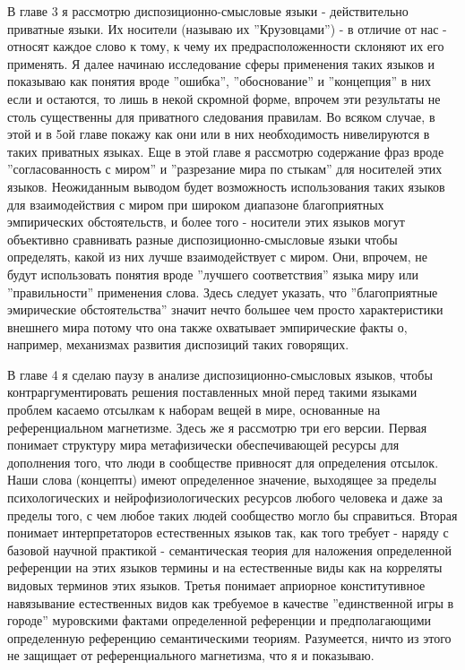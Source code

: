 \documentclass{book}
\begin{document}
В главе 3 я рассмотрю диспозиционно-смысловые языки - действительно приватные языки. Их носители (называю их ''Крузовцами'') - в отличие от нас - относят каждое слово к тому, к чему их предрасположенности склоняют их его применять. Я далее начинаю исследование сферы применения таких языков и показываю как понятия вроде ''ошибка'', ''обоснование'' и ''концепция'' в них если и остаются, то лишь в некой скромной форме, впрочем эти результаты не столь существенны для приватного следования правилам. Во всяком случае, в этой и в 5ой главе покажу как они или в них необходимость нивелируются в таких приватных языках. Еще в этой главе я рассмотрю содержание фраз вроде ''согласованность с миром'' и ''разрезание мира по стыкам'' для носителей этих языков. Неожиданным выводом будет возможность использования таких языков для взаимодействия с миром при широком диапазоне благоприятных эмпирических обстоятельств, и более того - носители этих языков могут объективно сравнивать разные диспозиционно-смысловые языки чтобы определять, какой из них лучше взаимодействует с миром. Они, впрочем, не будут использовать понятия вроде ''лучшего соответствия'' языка миру или ''правильности'' применения слова. Здесь следует указать, что ''благоприятные эмирические обстоятельства'' значит нечто большее чем просто характеристики внешнего мира потому что она также охватывает эмпирические факты о, например, механизмах развития диспозиций таких говорящих.

В главе 4 я сделаю паузу в анализе диспозиционно-смысловых языков, чтобы контраргументировать решения поставленных мной перед такими языками проблем касаемо отсылкам к наборам вещей в мире, основанные на референциальном магнетизме. Здесь же я рассмотрю три его версии. Первая понимает структуру мира метафизически обеспечивающей ресурсы для дополнения того, что люди в сообществе привносят для определения отсылок. Наши слова (концепты) имеют определенное значение, выходящее за пределы психологических и нейрофизиологических ресурсов любого человека и даже за пределы того, с чем любое таких людей сообщество могло бы справиться. Вторая понимает интерпретаторов естественных языков так, как того требует - наряду с базовой научной практикой - семантическая теория для наложения определенной референции на этих языков термины и на естественные виды как на корреляты видовых терминов этих языков. Третья понимает априорное конститутивное навязывание естественных видов как требуемое в качестве ''единственной игры в городе'' муровскими фактами определенной референции и предполагающими определенную референцию семантическими теориям. Разумеется, ничто из этого не защищает от референциального магнетизма, что я и показываю.
\end{document}
